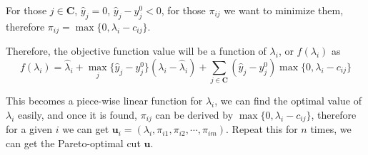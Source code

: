             For those $j \in \mathbf{C}$, $\hat{y}_j = 0$, $\hat{y}_j - y_j^0 < 0$, for those $\pi_{ij}$ we want to minimize them, therefore $\pi_{ij} = \max \{0, \lambda_i - c_{ij}\}$.

            Therefore, the objective function value will be a function of $\lambda_i$, or $f(\lambda_i)$ as 
            \begin{equation}
                f(\lambda_i) = \hat{\lambda}_i + \max_j \{\hat{y}_j - y_j^0\} (\lambda_i - \hat{\lambda}_i) + \sum_{j \in \mathbf{C}} (\hat{y}_j - y_j^0)\max\{0, \lambda_i - c_{ij}\}
            \end{equation}

            This becomes a piece-wise linear function for $\lambda_i$, we can find the optimal value of $\lambda_i$ easily, and once it is found, $\pi_{ij}$ can be derived by $\max\{0, \lambda_i - c_{ij}\}$, therefore for a given $i$ we can get $\mathbf{u}_{i} = (\lambda_i, \pi_{i1}, \pi_{i2}, \cdots, \pi_{im})$. Repeat this for $n$ times, we can get the Pareto-optimal cut $\mathbf{u}$.

